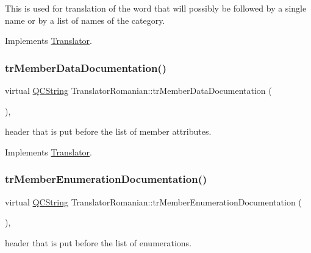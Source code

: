 This is used for translation of the word that will possibly be followed by a single name or by a list of names of the category. 

Implements \mbox{\hyperlink{class_translator}{Translator}}.

\mbox{\label{class_translator_romanian_a9e5b6f666617159fc90198aa86b88854}} 
\subsubsection{\texorpdfstring{trMemberDataDocumentation()}{trMemberDataDocumentation()}}
{\footnotesize\ttfamily virtual \mbox{\hyperlink{class_q_c_string}{Q\+C\+String}} Translator\+Romanian\+::tr\+Member\+Data\+Documentation (\begin{DoxyParamCaption}{ }\end{DoxyParamCaption})\hspace{0.3cm}{\ttfamily [inline]}, {\ttfamily [virtual]}}

header that is put before the list of member attributes. 

Implements \mbox{\hyperlink{class_translator}{Translator}}.

\mbox{\label{class_translator_romanian_a4079df8cdd7c9d6c2703b0a65305958d}} 
\subsubsection{\texorpdfstring{trMemberEnumerationDocumentation()}{trMemberEnumerationDocumentation()}}
{\footnotesize\ttfamily virtual \mbox{\hyperlink{class_q_c_string}{Q\+C\+String}} Translator\+Romanian\+::tr\+Member\+Enumeration\+Documentation (\begin{DoxyParamCaption}{ }\end{DoxyParamCaption})\hspace{0.3cm}{\ttfamily [inline]}, {\ttfamily [virtual]}}

header that is put before the list of enumerations. 

